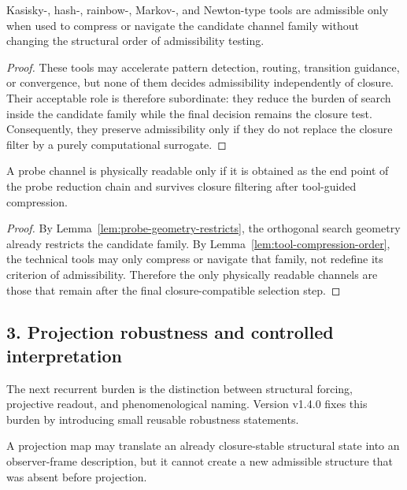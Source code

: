 \begin{lemma}
\label{lem:tool-compression-order}
Kasisky-, hash-, rainbow-, Markov-, and Newton-type tools are admissible only
when used to compress or navigate the candidate channel family without changing
the structural order of admissibility testing.
\end{lemma}

\begin{proof}
These tools may accelerate pattern detection, routing, transition guidance, or
convergence, but none of them decides admissibility independently of closure.
Their acceptable role is therefore subordinate: they reduce the burden of
search inside the candidate family while the final decision remains the closure
test. Consequently, they preserve admissibility only if they do not replace the
closure filter by a purely computational surrogate.
\end{proof}

\begin{proposition}
\label{prop:probe-reduction-principle}
A probe channel is physically readable only if it is obtained as the end point
of the probe reduction chain and survives closure filtering after tool-guided
compression.
\end{proposition}

\begin{proof}
By Lemma~\ref{lem:probe-geometry-restricts}, the orthogonal search geometry
already restricts the candidate family. By Lemma~\ref{lem:tool-compression-order},
the technical tools may only compress or navigate that family, not redefine its
criterion of admissibility. Therefore the only physically readable channels are
those that remain after the final closure-compatible selection step.
\end{proof}

\subsection*{3. Projection robustness and controlled interpretation}
The next recurrent burden is the distinction between structural forcing,
projective readout, and phenomenological naming. Version v1.4.0 fixes
this burden by introducing small reusable robustness statements.

\begin{lemma}
\label{lem:projection-no-creation}
A projection map may translate an already closure-stable structural state into
an observer-frame description, but it cannot create a new admissible structure
that was absent before projection.
\end{lemma}

